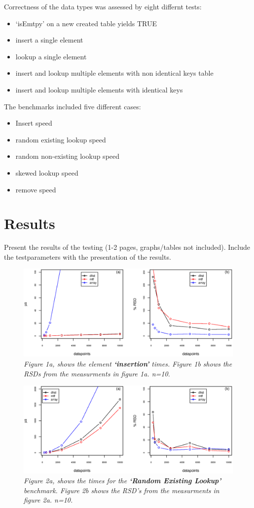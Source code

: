 \documentclass[a4paper,11pt,twoside]{article}
\begin{document}
Correctness of the data types was assessed by eight
differnt tests: 
\begin{itemize}
\item `isEmtpy' on a new created table yields TRUE
\item insert a single element
\item lookup a single element
\item insert and lookup multiple elements with non identical keys
table
\item insert and lookup multiple elements with identical keys
\end{itemize}

The benchmarks included five different cases: 
\begin{itemize}
\item Insert speed
\item random existing lookup speed
\item random non-existing lookup speed 
\item skewed lookup speed
\item remove speed  
\end{itemize}

\section{Results}
Present the results of the testing (1-2 pages, graphs/tables not
included). Include the testparameters with the presentation of the
results.
\begin{figure}[H] 
\centering 
\includegraphics[width=\textwidth]{figures/fig1.eps}
\caption{\textit{Figure 1a, shows the element \textbf{`insertion'}
    times. Figure 1b shows the RSDs from the measurments in figure 1a. n=10.}}
\end{figure}

\begin{figure}[H] 
\centering 
\includegraphics[width=\textwidth]{figures/fig2.eps}
\caption{\textit{Figure 2a, shows the times for the \textbf{`Random Existing
    Lookup'} benchmark. Figure 2b shows the RSD's from the measurments
in figure 2a. n=10.}}
\end{figure}
\end{document}
